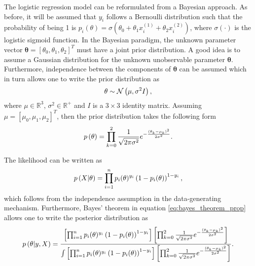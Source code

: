 
The logistic regression model can be reformulated from a Bayesian approach. As before, it will be assumed that $y_i$ follows a Bernoulli distribution such that the probability of being 1 is $p_i(\theta) = \sigma(\theta_0 + \theta_1 x_i^{(1)} + \theta_2 x_i^{(2)})$, where $\sigma \left( \cdot \right)$ is the logistic sigmoid function. In the Bayesian paradigm, the unknown parameter vector $\boldsymbol{\theta} = \left[ \theta_0, \theta_1, \theta_2 \right]^T$ must have a joint prior distribution. A good idea is to assume a Gaussian distribution for the unknown unobservable parameter $\boldsymbol{\theta}$. Furthermore, independence between the components of $\boldsymbol{\theta}$ can be assumed which in turn allows one to write the prior distribution as
\begin{equation}
  \theta \sim \mathcal{N}\left( \mu, \sigma^2 I \right),
\end{equation}
where $\mu \in \mathbb{R}^3$, $\sigma^2 \in \mathbb{R}^+$ and $I$ is a $3 \times 3$ identity matrix.
Assuming $\mu = \left[ \mu_0, \mu_1, \mu_2 \right]^T$, then the prior distribution takes the following form
\begin{equation}
  p\left( \theta \right) = \prod_{k = 0}^2 \frac{1}{\sqrt{2 \pi \sigma^2}} e^{- \frac{(\theta_k - \mu_k)^2}{2\sigma^2}}.
\end{equation}

The likelihood can be written as
\begin{equation}
  p\left( X | \theta \right) = \prod_{i = 1}^n  p_i(\theta)^{y_i}\left(1 - p_i(\theta) \right)^{1 - y_i},
\end{equation}
which follows from the independence assumption in the data-generating mechanism. Furthermore, Bayes' theorem in equation \eqref{eq:bayes_theorem_prop} allows one to write the posterior distribution as
\begin{equation}
  p\left( \theta | y, X \right) =
    \frac
    {
      \left[ \prod_{i = 1}^n  p_i(\theta)^{y_i}\left(1 - p_i(\theta) \right)^{1 - y_i} \right]
      \left[ \prod_{k = 0}^2 \frac{1}{\sqrt{2 \pi \sigma^2}} e^{- \frac{(\theta_k - \mu_k)^2}{2\sigma^2}} \right]
    }{
      \int \left[ \prod_{i = 1}^n  p_i(\theta)^{y_i}\left(1 - p_i(\theta) \right)^{1 - y_i} \right]
      \left[ \prod_{k = 0}^2 \frac{1}{\sqrt{2 \pi \sigma^2}} e^{- \frac{(\theta_k - \mu_k)^2}{2\sigma^2}} \right]
    }.
\end{equation}


